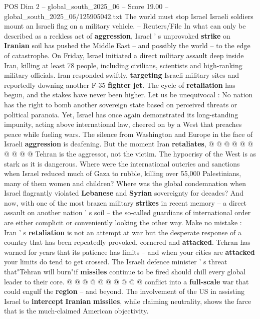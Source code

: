 \begin{textsample}{POS Dim 2 – global\_south\_2025\_06 – Score 19.00 – global\_south\_2025\_06/125905042.txt}  \label{ex:f2_pos_247}
The world must stop Israel Israeli soldiers mount an Israeli flag on a military vehicle. -- Reuters/File In what can only be described as a reckless act of \textbf{aggression}, Israel ' s unprovoked \textbf{strike} on \textbf{Iranian} soil has pushed the Middle East -- and possibly the world -- to the edge of catastrophe.
On Friday, Israel initiated a direct military assault deep inside Iran, killing at least 78 people, including civilians, scientists and high-ranking military officials.
Iran responded swiftly, \textbf{targeting} Israeli military sites and reportedly downing another F-35 \textbf{fighter} \textbf{jet}.
The cycle of \textbf{retaliation} has begun, and the stakes have never been higher.
Let us be unequivocal : No nation has the right to bomb another sovereign state based on perceived threats or political paranoia.
Yet, Israel has once again demonstrated its long-standing impunity, acting above international law, cheered on by a West that preaches peace while fueling wars.
The silence from Washington and Europe in the face of Israeli \textbf{aggression} is deafening.
But the moment Iran \textbf{retaliates}, @ @ @ @ @ @ @ @ @ @ Tehran is the aggressor, not the victim.
The hypocrisy of the West is as stark as it is dangerous.
Where were the international outcries and sanctions when Israel reduced much of Gaza to rubble, killing over 55,000 Palestinians, many of them women and children?
Where was the global condemnation when Israel flagrantly violated \textbf{Lebanese} and \textbf{Syrian} sovereignty for decades?
And now, with one of the most brazen military \textbf{strikes} in recent memory -- a direct assault on another nation ' s soil -- the so-called guardians of international order are either complicit or conveniently looking the other way.
Make no mistake : Iran ' s \textbf{retaliation} is not an attempt at war but the desperate response of a country that has been repeatedly provoked, cornered and \textbf{attacked}.
Tehran has warned for years that its patience has limits -- and when your cities are \textbf{attacked} your limits do tend to get crossed.
The Israeli defence minister ' s threat that"Tehran will burn"if \textbf{missiles} continue to be fired should chill every global leader to their core. @ @ @ @ @ @ @ @ @ @ conflict into a \textbf{full-scale} war that could engulf the \textbf{region} -- and beyond.
The involvement of the US in assisting Israel to \textbf{intercept} \textbf{Iranian} \textbf{missiles}, while claiming neutrality, shows the farce that is the much-claimed American objectivity.

\end{textsample}
